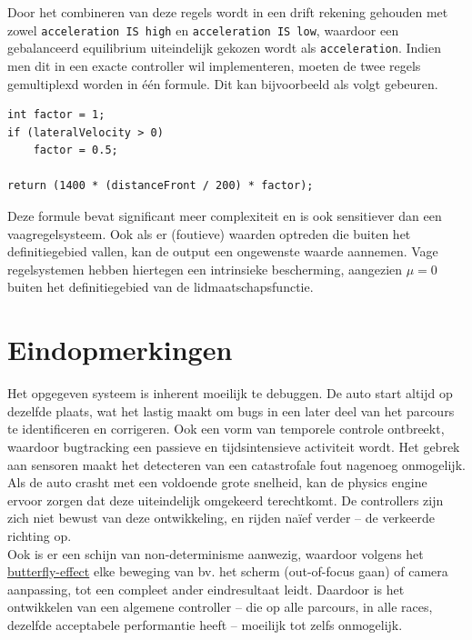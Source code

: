 \documentclass[10pt,a4paper]{article}
\begin{document}
			Door het combineren van deze regels wordt in een drift rekening gehouden met zowel \texttt{acceleration IS high} en \texttt{acceleration IS low}, waardoor een gebalanceerd equilibrium uiteindelijk gekozen wordt als \texttt{acceleration}.
			Indien men dit in een exacte controller wil implementeren, moeten de twee regels gemultiplexd worden in \'e\'en formule. Dit kan bijvoorbeeld als volgt gebeuren. %

			\begin{lstlisting}
int factor = 1;
if (lateralVelocity > 0)
	factor = 0.5;

return (1400 * (distanceFront / 200) * factor);
			\end{lstlisting}

			Deze formule bevat significant meer complexiteit en is ook sensitiever dan een vaagregelsysteem. Ook als er (foutieve) waarden optreden die buiten het definitiegebied vallen, kan de output een ongewenste waarde aannemen. Vage regelsystemen hebben hiertegen een intrinsieke bescherming, aangezien $\mu = 0$ buiten het definitiegebied van de lidmaatschapsfunctie.

		\section*{Eindopmerkingen}
			Het opgegeven systeem is inherent moeilijk te debuggen. De auto start altijd op dezelfde plaats, wat het lastig maakt om bugs in een later deel van het parcours te identificeren en corrigeren. Ook een vorm van temporele controle ontbreekt, waardoor bugtracking een passieve en tijdsintensieve activiteit wordt. Het gebrek aan sensoren maakt het detecteren van een catastrofale fout nagenoeg onmogelijk. Als de auto crasht met een voldoende grote snelheid, kan de physics engine ervoor zorgen dat deze uiteindelijk omgekeerd terechtkomt. De controllers zijn zich niet bewust van deze ontwikkeling, en rijden na\"ief verder -- de verkeerde richting op.\\

			Ook is er een schijn van non-determinisme aanwezig, waardoor volgens het \href{https://en.wikipedia.org/wiki/Butterfly_effect}{butterfly-effect} elke beweging van bv. het scherm (out-of-focus gaan) of camera aanpassing, tot een compleet ander eindresultaat leidt. Daardoor is het ontwikkelen van een algemene controller -- die op alle parcours, in alle races, dezelfde acceptabele performantie heeft -- moeilijk tot zelfs onmogelijk.\\
\end{document}
